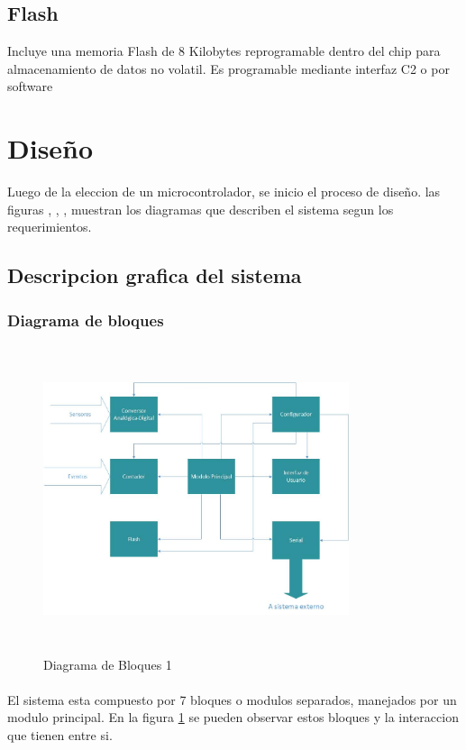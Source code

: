 \documentclass{article}
\theoremstyle{definition}
\theoremstyle{remark}
\begin{document}
\subsection{Flash}
Incluye una memoria Flash de 8 Kilobytes reprogramable dentro del chip para almacenamiento de datos no volatil. Es programable mediante interfaz C2 o por software

\section{Diseño}

Luego de la eleccion de un microcontrolador, se inicio el proceso de diseño. las figuras , , , muestran los diagramas que describen el sistema segun los requerimientos.

\subsection{Descripcion grafica del sistema}
\subsubsection{Diagrama de bloques}
\begin{figure}[h]
  \centering
  \includegraphics[width=0.80\textwidth, height = 9cm]{Bloques1}
  \caption{Diagrama de Bloques 1}\label{fig:bloques1}
\end{figure}

\paragraph{}
El sistema esta compuesto por 7 bloques o modulos separados, manejados por un modulo principal. En la figura \ref{fig:bloques1} se pueden observar estos bloques y la interaccion que tienen entre si.
\end{document}
